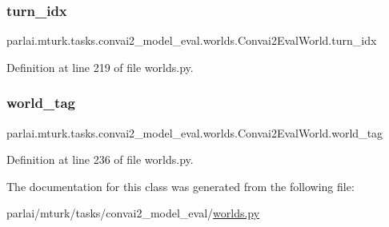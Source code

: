 \subsubsection{\texorpdfstring{turn\+\_\+idx}{turn\_idx}}
{\footnotesize\ttfamily parlai.\+mturk.\+tasks.\+convai2\+\_\+model\+\_\+eval.\+worlds.\+Convai2\+Eval\+World.\+turn\+\_\+idx}



Definition at line 219 of file worlds.\+py.

\mbox{\label{classparlai_1_1mturk_1_1tasks_1_1convai2__model__eval_1_1worlds_1_1Convai2EvalWorld_ac3c2c639d22166002b9a8ee1982f3f3f}} 
\subsubsection{\texorpdfstring{world\+\_\+tag}{world\_tag}}
{\footnotesize\ttfamily parlai.\+mturk.\+tasks.\+convai2\+\_\+model\+\_\+eval.\+worlds.\+Convai2\+Eval\+World.\+world\+\_\+tag}



Definition at line 236 of file worlds.\+py.



The documentation for this class was generated from the following file\+:\begin{DoxyCompactItemize}
\item 
parlai/mturk/tasks/convai2\+\_\+model\+\_\+eval/\hyperlink{parlai_2mturk_2tasks_2convai2__model__eval_2worlds_8py}{worlds.\+py}\end{DoxyCompactItemize}
